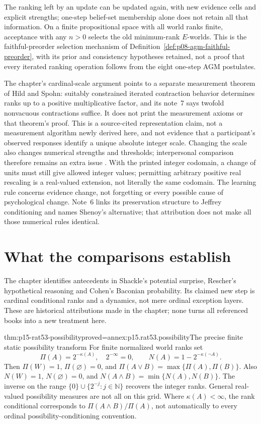 The ranking left by an update can be updated again, with new evidence cells
and explicit strengths; one-step belief-set membership alone does not retain
all that information.  On a finite propositional space with all world ranks
finite, acceptance with any \(n>0\) selects the old minimum-rank
\(E\)-worlds.  This is the faithful-preorder selection mechanism of
Definition~\ref{def:p08-agm-faithful-preorder}, with its prior and consistency
hypotheses retained, not a proof that every iterated ranking operation follows
from the eight one-step AGM postulates.

The chapter's cardinal-scale argument points to a separate measurement theorem
of Hild and Spohn: suitably constrained iterated contraction behavior
determines ranks up to a positive multiplicative factor, and its note~7 says
twofold nonvacuous contractions suffice.  It does not print the measurement
axioms or that theorem's proof.  This is a source-cited representation claim,
not a measurement algorithm newly derived here, and not evidence that a
participant's observed responses identify a unique absolute integer scale.
Changing the scale also changes numerical strengths and thresholds; interpersonal
comparison therefore remains an extra issue
\parencite[p.~340 and n.~7]{KernIsbernerSkovgaardOlsenSpohn2021Ranking}.
With the printed integer codomain, a change of units must still give
allowed integer values; permitting arbitrary positive real rescaling is
a real-valued extension, not literally the same codomain.
The learning rule concerns evidence change, not forgetting or every possible
cause of psychological change.  Note~6 links its preservation structure to
Jeffrey conditioning and names Shenoy's alternative; that attribution does
not make all those numerical rules identical.

\section{What the comparisons establish}

The chapter identifies antecedents in Shackle's potential surprise, Rescher's
hypothetical reasoning and Cohen's Baconian probability.  Its claimed new step
is cardinal conditional ranks and a dynamics, not mere ordinal exception
layers.  These are historical attributions made in the chapter; none turns
all referenced books into a new treatment here.

\begin{hbtheorem}{thm:p15-rat53-possibility}{proved=annex:p15.rat53.possibility}{The precise finite static possibility transform}
For finite normalized world ranks set
\[
 \Pi(A)=2^{-\kappa(A)},\quad 2^{-\infty}=0,\qquad
 N(A)=1-2^{-\kappa(\neg A)}.
\]
Then \(\Pi(W)=1\), \(\Pi(\varnothing)=0\), and
\(\Pi(A\lor B)=\max\{\Pi(A),\Pi(B)\}\).
Also \(N(W)=1\), \(N(\varnothing)=0\), and
\(N(A\land B)=\min\{N(A),N(B)\}\).
The inverse on the range \(\{0\}\cup\{2^{-j}:j\in\mathbb N\}\)
recovers the integer ranks.  General real-valued possibility measures are not
all on this grid.  Where \(\kappa(A)<\infty\), the rank conditional
corresponds to \(\Pi(A\land B)/\Pi(A)\), not automatically to every
ordinal possibility-conditioning convention.
\end{hbtheorem}

